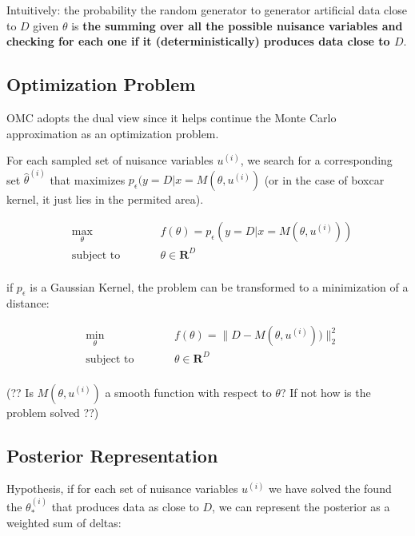 \documentclass{article}
\newcommand{\norm}[1]{\lVert#1\rVert_2}
\begin{document}
Intuitively: the probability the random generator to generator artificial data close to $D$ given $\theta$ is \textbf{the summing over all the possible nuisance variables and checking for each one if it (deterministically) produces data close to $D$}.


\subsection*{Optimization Problem}

OMC adopts the dual view since it helps continue the Monte Carlo approximation as an optimization problem.

For each sampled set of nuisance variables $u^{(i)}$, we search for a corresponding set $\hat{\theta}^{(i)}$ that maximizes $p_\epsilon (y=D|x=M(\theta, u^{(i)})$ (or in the case of boxcar kernel, it just lies in the permited area).

\begin{subequations}
\begin{alignat}{2}
&\!\max_{\theta}        &\qquad& f(\theta) = p_\epsilon (y=D|x=M(\theta, u^{(i)}))\label{eq:optProb}\\
&\text{subject to} &      & \theta \in \mathbf{R}^D \\
\end{alignat}
\end{subequations}

if $p_\epsilon$ is a Gaussian Kernel, the problem can be transformed to a minimization of a distance:

\begin{subequations}
\begin{alignat}{2}
&\!\min_{\theta}        &\qquad& f(\theta) = \norm{D - M(\theta, u^{(i)}))}^2\label{eq:optProb}\\
&\text{subject to} &      & \theta \in \mathbf{R}^D \\
\end{alignat}
\end{subequations}


(?? Is $M(\theta, u^{(i)})$ a smooth function with respect to $\theta$? If not how is the problem solved ??)


\subsection*{Posterior Representation}

Hypothesis, if for each set of nuisance variables $u^{(i)}$ we have solved the found the $\theta_*^{(i)}$ that produces data as close to $D$, we can represent the posterior as a weighted sum of deltas:
\end{document}
